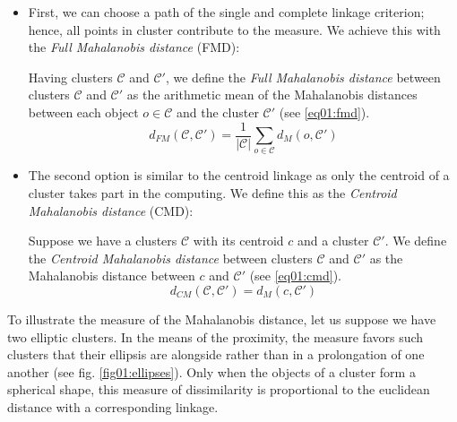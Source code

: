 \begin{itemize}

\item
First, we can choose a path of the single and complete linkage criterion; hence, all points in cluster contribute to the measure. We achieve this with the \emph{Full Mahalanobis distance} (FMD):

\begin{defn}
	Having clusters $\mathcal{C}$ and $\mathcal{C}'$, we define the \emph{Full Mahalanobis distance} between clusters $\mathcal{C}$ and $\mathcal{C}'$ as the arithmetic mean of the Mahalanobis distances between each object $o \in \mathcal{C}$ and the cluster $\mathcal{C}'$ (see \ref{eq01:fmd}).
	\begin{equation}\label{eq01:fmd}
	d_{FM}(\mathcal{C},\mathcal{C}') =\frac{1}{|\mathcal{C}|}\sum_{o\in\mathcal{C}}{d_M(o,\mathcal{C}')}
	\end{equation}
	\label{def01:fmd}
\end{defn}

\item
The second option is similar to the centroid linkage as only the centroid of a cluster takes part in the computing. We define this as the \emph{Centroid Mahalanobis distance} (CMD):

\begin{defn}
	Suppose we have a clusters $\mathcal{C}$ with its centroid $c$ and a cluster $\mathcal{C}'$. We define the \emph{Centroid Mahalanobis distance} between clusters $\mathcal{C}$ and $\mathcal{C}'$ as the Mahalanobis distance between $c$ and $\mathcal{C}'$ (see \ref{eq01:cmd}).
	\begin{equation}\label{eq01:cmd}
	d_{CM}(\mathcal{C},\mathcal{C}')=d_M(c,\mathcal{C}')
	\end{equation}
	\label{def01:cmd}
\end{defn}

\end{itemize}

To illustrate the measure of the Mahalanobis distance, let us suppose we have two elliptic clusters. In the means of the proximity, the measure favors such clusters that their ellipsis are alongside rather than in a prolongation of one another \cite{dagnelie1991using} (see fig. \ref{fig01:ellipses}). Only when the objects of a cluster form a spherical shape, this measure of dissimilarity is proportional to the euclidean distance with a corresponding linkage.

